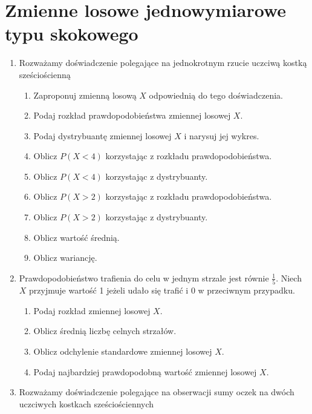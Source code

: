 \documentclass[twoside]{mwart}
\newcommand{\ans}[1]{}
\newcommand{\ans}[1]{\par\emph{Odpowiedź:} #1}
\begin{document}
\section{Zmienne losowe jednowymiarowe typu skokowego}
\begin{enumerate}
\item Rozważamy doświadczenie polegające na jednokrotnym rzucie uczciwą kostką sześciościenną
\begin{enumerate}
\item Zaproponuj zmienną losową $X$ odpowiednią do tego doświadczenia. \ans{$X\colon\Omega\to\{1,\ldots,6\}$}
\item Podaj rozkład prawdopodobieństwa zmiennej losowej $X$. \ans{$P(X=i)=\frac{1}{6}$}
\item Podaj dystrybuantę zmiennej losowej $X$ i narysuj jej wykres.
\item Oblicz $P(X<4)$ korzystając z rozkładu prawdopodobieństwa. \ans{$P(X<4)=P(X=1)+P(X=2)+P(X=3)$}
\item Oblicz $P(X<4)$ korzystając z dystrybuanty. \ans{$P(X<4)=F_X(4)$}
\item Oblicz $P(X>2)$ korzystając z rozkładu prawdopodobieństwa. \ans{$P(X>2)=P(X=3)+\ldots+P(X=6)$}
\item Oblicz $P(X>2)$ korzystając z dystrybuanty. \ans{$P(X>2)=1-P(X\leq 2)=1-P(X<3)=1-F(3)$}
\item Oblicz wartość średnią. \ans{$EX=\frac{21}{6}=3{,}5$}
\item Oblicz wariancję. \ans{$D^2X=\frac{1}{6}((-2{,}5)^2+(-1{,}5)^2+(-0{,}5)^2+2{,}5^2+1{,}5^2+0{,}5^2)$}
\end{enumerate}
\item Prawdopodobieństwo trafienia do celu w jednym strzale jest równie $\frac{1}{5}$. Niech $X$ przyjmuje wartość 1 jeżeli udało się trafić i 0 w przeciwnym przypadku.
\begin{enumerate}
\item Podaj rozkład zmiennej losowej $X$. \ans{$P(X=1)=p\quad P(X=0)=1-p$}
\item Oblicz średnią liczbę celnych strzałów. \ans{$EX=p=0{,}2$}
\item Oblicz odchylenie standardowe zmiennej losowej $X$. \ans{$DX=\sqrt{p(1-p)}=0{,}4$}
\item Podaj najbardziej prawdopodobną wartość zmiennej losowej $X$. \ans{$0$}
\end{enumerate}
\item Rozważamy doświadczenie polegające na obserwacji sumy oczek na dwóch uczciwych kostkach sześciościennych

\end{enumerate}
\end{document}
